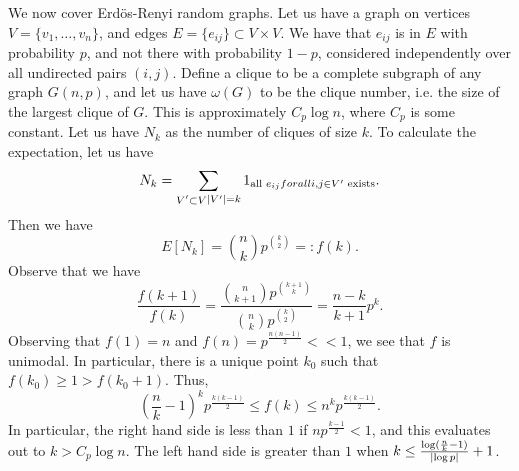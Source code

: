 \newpage
\noindent We now cover Erd\"os-Renyi random graphs. Let us have a graph on vertices $V = \{v_1, \dots, v_n\}$, and edges $E = \{e_{ij}\} \subset V \times V$. We have that $e_{ij}$ is in $E$ with probability $p$, and not there with probability $1 - p$, considered independently over all undirected pairs $(i, j)$.
\medskip\newline
\noindent Define a clique to be a complete subgraph of any graph $G(n, p)$, and let us have $\omega(G)$ to be the clique number, i.e. the size of the largest clique of $G$. This is approximately $C_p \log n$, where $C_p$ is some constant. Let us have $N_k$ as the number of cliques of size $k$. To calculate the expectation, let us have
\[ N_k = \sum_{\substack{V' \subset V}{\left\lvert V' \right\rvert = k}} 1_{\text{all } e_{ij} { for all } i, j \in V' \text{ exists}}. \]
Then we have
\[ E[N_k] = \binom{n}{k} p^{\binom{k}{2}} =: f(k). \]
Observe that we have
\[ \frac{f(k+1)}{f(k)} = \frac{\binom{n}{k+1} p^{\binom{k+1}{k}}}{\binom{n}{k} p^{\binom{k}{2}}} = \frac{n-k}{k+1} p^k. \]
Observing that $f(1) = n$ and $f(n) = p^{\frac{n(n-1)}{2}} << 1$, we see that $f$ is unimodal. In particular, there is a unique point $k_0$ such that $f(k_0) \geq 1 > f(k_0 + 1)$. Thus,
\[ \left(\frac{n}{k} - 1\right)^k p^{\frac{k(k-1)}{2}} \leq f(k) \leq n^k p^{\frac{k(k-1)}{2}}. \]
In particular, the right hand side is less than $1$ if $np^{\frac{k-1}{2}} < 1$, and this evaluates out to $k > C_p \log n$. The left hand side is greater than $1$ when $k \leq \frac{\log(\frac{n}{k} - 1)}{\left\lvert \log p \right\rvert} + 1$.
